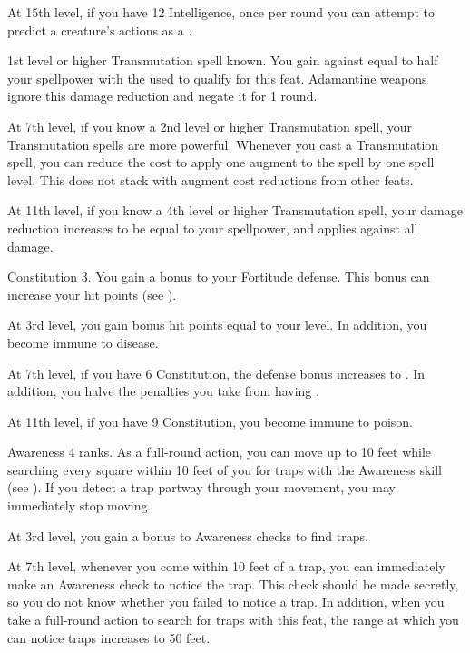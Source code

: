     At 15th level, if you have 12 Intelligence, once per round you can attempt to predict a creature's actions as a .

    \featpre 1st level or higher Transmutation spell known.
    \featben You gain  against  equal to half your spellpower with the  used to qualify for this feat.
    Adamantine weapons ignore this damage reduction and negate it for 1 round.

    At 7th level, if you know a 2nd level or higher Transmutation spell, your Transmutation spells are more powerful.
    Whenever you cast a Transmutation spell, you can reduce the cost to apply one augment to the spell by one spell level.
    This does not stack with augment cost reductions from other feats.

    At 11th level, if you know a 4th level or higher Transmutation spell, your damage reduction increases to be equal to your spellpower, and applies against all damage.

    \featpre Constitution 3.
    \featben You gain a  bonus to your Fortitude defense.
    This bonus can increase your hit points (see ).

    At 3rd level, you gain bonus hit points equal to your level.
    In addition, you become immune to disease.

    At 7th level, if you have 6 Constitution, the defense bonus increases to .
    In addition, you halve the penalties you take from having .

    At 11th level, if you have 9 Constitution, you become immune to poison.

    \featpre Awareness 4 ranks.
    \featben As a full-round action, you can move up to 10 feet while searching every square within 10 feet of you for traps with the Awareness skill (see ).
    If you detect a trap partway through your movement, you may immediately stop moving.

    At 3rd level, you gain a  bonus to Awareness checks to find traps.

    At 7th level, whenever you come within 10 feet of a trap, you can immediately make an Awareness check to notice the trap.
    This check should be made secretly, so you do not know whether you failed to notice a trap.
    In addition, when you take a full-round action to search for traps with this feat, the range at which you can notice traps increases to 50 feet.

